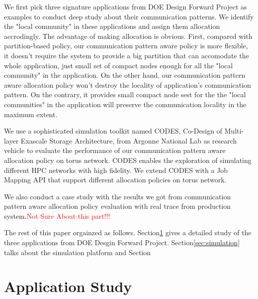 \documentclass[conference]{IEEEtran}
\begin{document}
We first pick three signature applications from DOE Design Forward Project\cite{design forward webpage} as examples to conduct deep study about their communication patterns. We identify the "local community" in these applications and assign them allocation accrodingly. The advantage of making allocation is obvious. First, compared with partition-based policy, our communication pattern aware policy is more flexible, it doesn't require the system to provide a big partition that can accomodate the whole application, just small set of compact nodes enough for all the "local community" in the application. On the other hand, our communication pattern aware allocation policy won't destroy the locality of application's communication pattern. On the contrary, it provides small compact node sest for the the "local communities" in the application will preserve the communication locality in the maximum extent.

We use a sophisticated simulation toolkit named CODES, Co-Design of Multi-layer Exascale Storage Architecture, from Argonne National Lab as research vehicle to evaluate the performance of our communication pattern aware allocation policy on torus network. CODES enables the exploration of simulating different HPC networks with high fidelity\cite{Jason-2011}. We extend CODES with a Job Mapping API that support different allocation policies on torus network.

We also conduct a case study with the results we got from communication pattern aware allocation policy evaluation with real trace from production system.\textcolor{red}{Not Sure About this part!!!}

The rest of this paper orgainzed as follows. Section\ref{sec:application study} gives a detailed study of the three applications from DOE Desgin Forward Project. Section\ref{sec:simulation} talks about the simulation platform and Section




\section{Application Study}
\label{sec:application study}
\end{document}
